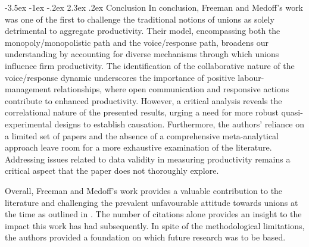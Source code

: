 \documentclass[11pt]{article}
\makeatletter
\renewcommand\section{\leftskip 0pt\@startsection {section}{1}{\z@}%
	{-3.5ex \@plus -1ex \@minus -.2ex}%
	{2.3ex \@plus.2ex}%
	{\normalfont\Large\bfseries}}
\makeatother
\begin{document}
\begin{spacing}{1.7}
	\section{Conclusion}
	In conclusion, Freeman and Medoff's work was one of the first to challenge the traditional notions of unions as solely detrimental to aggregate productivity. Their model, encompassing both the monopoly/monopolistic path and the voice/response path, broadens our understanding by accounting for diverse mechanisms through which unions influence firm productivity. The identification of the collaborative nature of the voice/response dynamic underscores the importance of positive labour-management relationships, where open communication and responsive actions contribute to enhanced productivity. However, a critical analysis reveals the correlational nature of the presented results, urging a need for more robust quasi-experimental designs to establish causation. Furthermore, the authors' reliance on a limited set of papers and the absence of a comprehensive meta-analytical approach leave room for a more exhaustive examination of the literature. Addressing issues related to data validity in measuring productivity remains a critical aspect that the paper does not thoroughly explore.

	Overall, Freeman and Medoff's work provides a valuable contribution to the literature and challenging the prevalent unfavourable attitude towards unions at the time as outlined in \cite{freeman1979two}. The number of citations alone provides an insight to the impact this work has had subsequently. In spite of the methodological limitations, the authors provided a foundation on which future research was to be based. 

	
	\end{spacing}
\end{document}
